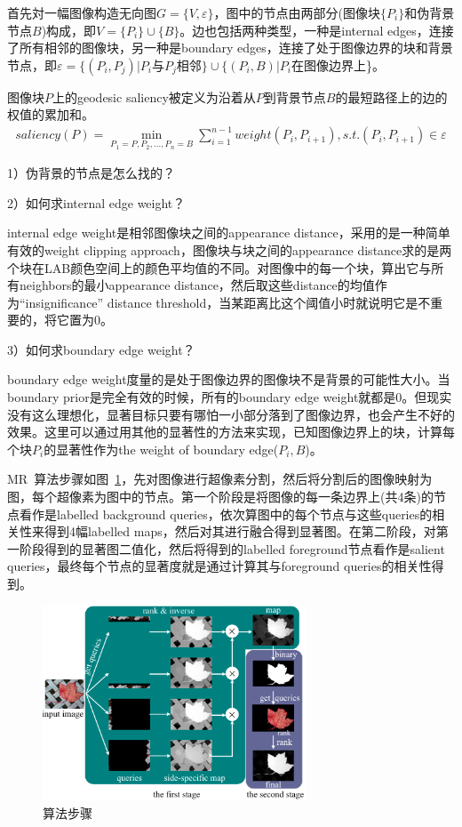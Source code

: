 \documentclass[12pt]{article}
\begin{document}
首先対一幅图像构造无向图$G = \{V, \varepsilon \}$，图中的节点由两部分(图像块$\{P_i\}$和伪背景节点$B$)构成，即$V = \{P_i\}\cup \{B\}$。边也包括两种类型，一种是internal edges，连接了所有相邻的图像块，另一种是boundary edges，连接了处于图像边界的块和背景节点，即$\varepsilon = \{(P_i, P_j)|$$P_i$与$P_j$相邻$\} \cup \{(P_i, B)|$$P_i$在图像边界上\}。

图像块$P$上的geodesic saliency被定义为沿着从$P$到背景节点$B$的最短路径上的边的权值的累加和。
\begin{align}
saliency(P) = \min_{P_1=P, P_2, \ldots, P_n=B}\sum_{i=1}^{n-1}weight(P_i, P_{i+1}), s.t.(P_i, P_{i+1})\in \varepsilon
\end{align}

1）伪背景的节点是怎么找的？

2）如何求internal edge weight？

internal edge weight是相邻图像块之间的appearance distance，采用的是一种简单有效的weight clipping approach，图像块与块之间的appearance distance求的是两个块在LAB颜色空间上的颜色平均值的不同。对图像中的每一个块，算出它与所有neighbors的最小appearance distance，然后取这些distance的均值作为“insignificance” distance threshold，当某距离比这个阈值小时就说明它是不重要的，将它置为0。

3）如何求boundary edge weight？

boundary edge weight度量的是处于图像边界的图像块不是背景的可能性大小。当boundary prior是完全有效的时候，所有的boundary edge weight就都是0。但现实没有这么理想化，显著目标只要有哪怕一小部分落到了图像边界，也会产生不好的效果。这里可以通过用其他的显著性的方法来实现，已知图像边界上的块，计算每个块$P_i$的显著性作为the weight of boundary edge($P_i, B$)。

MR~\cite{yang2013saliency}算法步骤如图~\ref{fig: MR1}，先对图像进行超像素分割，然后将分割后的图像映射为图，每个超像素为图中的节点。第一个阶段是将图像的每一条边界上(共4条)的节点看作是labelled background queries，依次算图中的每个节点与这些queries的相关性来得到4幅labelled maps，然后对其进行融合得到显著图。在第二阶段，对第一阶段得到的显著图二值化，然后将得到的labelled foreground节点看作是salient queries，最终每个节点的显著度就是通过计算其与foreground queries的相关性得到。
\begin{figure}[!ht]
\centering
\includegraphics[width=0.7\textwidth]{MR1.png}
\caption{算法步骤}
\label{fig: MR1}
\end{figure}
\end{document}
